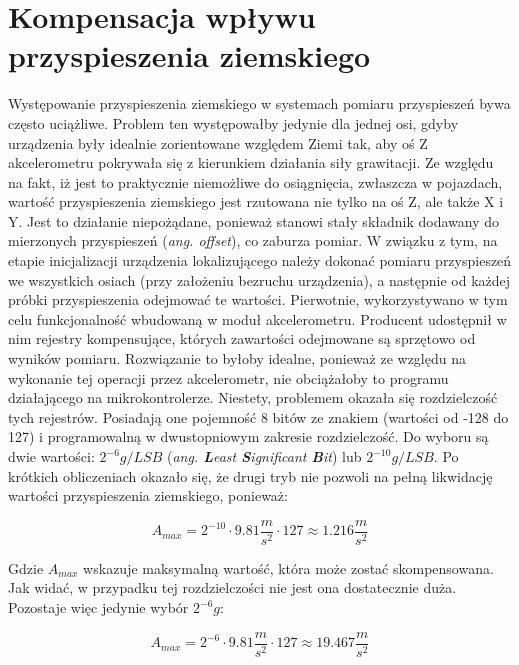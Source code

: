 \section{Kompensacja wpływu przyspieszenia ziemskiego}

Występowanie przyspieszenia ziemskiego w systemach pomiaru przyspieszeń bywa często uciążliwe. Problem ten występowałby jedynie dla jednej osi, gdyby urządzenia były idealnie zorientowane względem Ziemi tak, aby oś Z akcelerometru pokrywała się z kierunkiem działania siły grawitacji. Ze względu na fakt, iż jest to praktycznie niemożliwe do osiągnięcia, zwłaszcza w pojazdach, wartość przyspieszenia ziemskiego jest rzutowana nie tylko na oś Z, ale także X i Y. Jest to działanie niepożądane, ponieważ stanowi stały składnik dodawany do mierzonych przyspieszeń (\textit{ang. offset}), co zaburza pomiar. W związku z tym, na etapie inicjalizacji urządzenia lokalizującego należy dokonać pomiaru przyspieszeń we wszystkich osiach (przy założeniu bezruchu urządzenia), a następnie od każdej próbki przyspieszenia odejmować te wartości.
Pierwotnie, wykorzystywano w tym celu funkcjonalność wbudowaną w moduł akcelerometru. Producent udostępnił w nim rejestry kompensujące, których zawartości odejmowane są sprzętowo od wyników pomiaru. Rozwiązanie to byłoby idealne, ponieważ ze względu na wykonanie tej operacji przez akcelerometr, nie obciążałoby to programu działającego na mikrokontrolerze. Niestety, problemem okazała się rozdzielczość tych rejestrów. Posiadają one pojemność 8 bitów ze znakiem (wartości od -128 do 127) i programowalną w dwustopniowym zakresie rozdzielczość. Do wyboru są dwie wartości: $2^{-6}g/LSB$ (\textit{ang. \textbf{L}east \textbf{S}ignificant \textbf{B}it}) lub $2^{-10}g/LSB$. 
Po krótkich obliczeniach okazało się, że drugi tryb nie pozwoli na pełną likwidację wartości przyspieszenia ziemskiego, ponieważ:

\begin{equation}
A_{max} = 2^{-10} \cdot 9.81\frac{m}{s^2} \cdot 127 \approx 1.216 \frac{m}{s^2}
\end{equation}

Gdzie $A_{max}$ wskazuje maksymalną wartość, która może zostać skompensowana. Jak widać, w przypadku tej rozdzielczości nie jest ona dostatecznie duża. Pozostaje więc jedynie wybór $2^{-6} g$:

\begin{equation}
A_{max} = 2^{-6} \cdot 9.81\frac{m}{s^2} \cdot 127 \approx 19.467 \frac{m}{s^2}
\end{equation}

